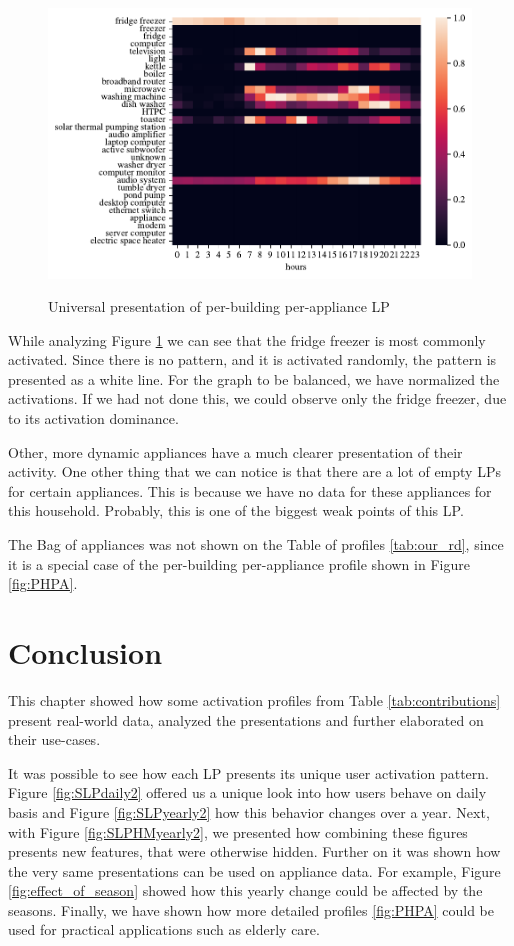 \begin{figure}[H]
	\centering
	\caption{Universal presentation of per-building per-appliance LP}
	\includegraphics[width=1\textwidth]{../Figures/LPS/BOA.pdf}
	\label{fig:BOA}
\end{figure}

While analyzing Figure \ref{fig:BOA} we can see that the fridge freezer is most commonly activated.
Since there is no pattern, and it is activated randomly, the pattern is presented as a white line.
For the graph to be balanced, we have normalized the activations.
If we had not done this, we could observe only the fridge freezer, due to its activation dominance. 

Other, more dynamic appliances have a much clearer presentation of their activity. 
One other thing that we can notice is that there are a lot of empty LPs for certain appliances.
This is because we have no data for these appliances for this household.
Probably, this is one of the biggest weak points of this LP.

The Bag of appliances was not shown on the Table of profiles \ref{tab:our_rd},
since it is a special case of the per-building per-appliance profile shown in Figure \ref{fig:PHPA}.

\section{Conclusion}

This chapter showed how some activation profiles from Table \ref{tab:contributions} present real-world data, analyzed the presentations and further elaborated on their use-cases.

It was possible to see how each LP presents its unique user activation pattern. 
Figure \ref{fig:SLPdaily2} offered us a unique look into how users behave on daily basis and Figure \ref{fig:SLPyearly2} how this behavior changes over a year.
Next, with Figure \ref{fig:SLPHMyearly2}, we presented how combining these figures presents new features, that were otherwise hidden.
Further on it was shown how the very same presentations can be used on appliance data.
For example, Figure \ref{fig:effect_of_season} showed how this yearly change could be affected by the seasons.
Finally, we have shown how more detailed profiles \ref{fig:PHPA} could be used for practical applications such as elderly care. 